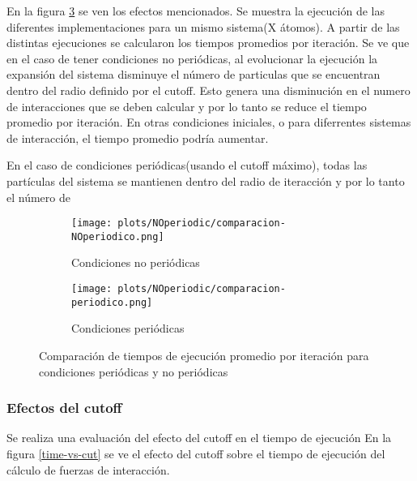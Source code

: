 En la figura \ref{periodic-effects} se ven los efectos mencionados. Se muestra la ejecución de las diferentes implementaciones para un mismo sistema(X átomos). 
A partir de las distintas ejecuciones se calcularon los tiempos promedios por iteración. 
Se ve que en el caso de tener condiciones no periódicas, al evolucionar la ejecución la expansión del sistema disminuye el número de particulas que se encuentran dentro del radio definido por el cutoff.
Esto genera una disminución en el numero de interacciones que se deben calcular y por lo tanto se reduce el tiempo promedio por iteración. 
En otras condiciones iniciales, o para diferrentes sistemas de interacción, el tiempo promedio podría aumentar.

En el caso de condiciones periódicas(usando el cutoff máximo), todas las partículas del sistema se mantienen dentro del radio de iteracción y por lo tanto el número de 

\begin{figure}[htbp]
\centering
\begin{subfigure}[b]{\plotwidthtres}
   \texttt{[image: plots/NOperiodic/comparacion-NOperiodico.png]}
   \caption{Condiciones no periódicas}
   \label{compar-1iter}
 \end{subfigure}
\begin{subfigure}[b]{\plotwidthtres}
   \texttt{[image: plots/NOperiodic/comparacion-periodico.png]}
   \caption{Condiciones periódicas}
   \label{compar-niter}
 \end{subfigure}
 \caption{Comparaci\'on de tiempos de ejecuci\'on promedio por iteración para condiciones periódicas y no periódicas}
 \label{periodic-effects}
\end{figure}


\subsubsection{Efectos del cutoff}
Se realiza una evaluación del efecto del cutoff en el tiempo de ejecución
En la figura \ref{time-vs-cut} se ve el efecto del cutoff sobre el tiempo de ejecución del cálculo de fuerzas de interacción.

